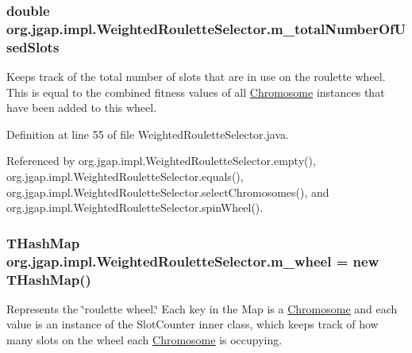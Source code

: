 \hypertarget{classorg_1_1jgap_1_1impl_1_1_weighted_roulette_selector_a2e232452c43c7625bea03cb4799500d8}{
\subsubsection[{m\-\_\-total\-Number\-Of\-Used\-Slots}]{\setlength{\rightskip}{0pt plus 5cm}double org.\-jgap.\-impl.\-Weighted\-Roulette\-Selector.\-m\-\_\-total\-Number\-Of\-Used\-Slots\hspace{0.3cm}{\ttfamily [private]}}}\label{classorg_1_1jgap_1_1impl_1_1_weighted_roulette_selector_a2e232452c43c7625bea03cb4799500d8}
Keeps track of the total number of slots that are in use on the roulette wheel. This is equal to the combined fitness values of all \hyperlink{classorg_1_1jgap_1_1_chromosome}{Chromosome} instances that have been added to this wheel. 

Definition at line 55 of file Weighted\-Roulette\-Selector.\-java.



Referenced by org.\-jgap.\-impl.\-Weighted\-Roulette\-Selector.\-empty(), org.\-jgap.\-impl.\-Weighted\-Roulette\-Selector.\-equals(), org.\-jgap.\-impl.\-Weighted\-Roulette\-Selector.\-select\-Chromosomes(), and org.\-jgap.\-impl.\-Weighted\-Roulette\-Selector.\-spin\-Wheel().

\hypertarget{classorg_1_1jgap_1_1impl_1_1_weighted_roulette_selector_aab723231155bb89882434f47f092a55a}{
\subsubsection[{m\-\_\-wheel}]{\setlength{\rightskip}{0pt plus 5cm}T\-Hash\-Map org.\-jgap.\-impl.\-Weighted\-Roulette\-Selector.\-m\-\_\-wheel = new T\-Hash\-Map()\hspace{0.3cm}{\ttfamily [private]}}}\label{classorg_1_1jgap_1_1impl_1_1_weighted_roulette_selector_aab723231155bb89882434f47f092a55a}
Represents the \char`\"{}roulette wheel.\char`\"{} Each key in the Map is a \hyperlink{classorg_1_1jgap_1_1_chromosome}{Chromosome} and each value is an instance of the Slot\-Counter inner class, which keeps track of how many slots on the wheel each \hyperlink{classorg_1_1jgap_1_1_chromosome}{Chromosome} is occupying. 


